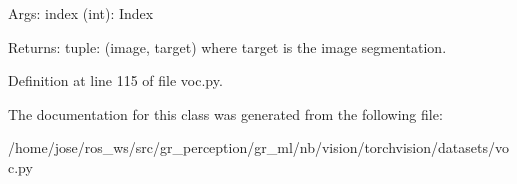 \begin{DoxyVerb}Args:
    index (int): Index

Returns:
    tuple: (image, target) where target is the image segmentation.
\end{DoxyVerb}
 

Definition at line 115 of file voc.\+py.



The documentation for this class was generated from the following file\+:\begin{DoxyCompactItemize}
\item 
/home/jose/ros\+\_\+ws/src/gr\+\_\+perception/gr\+\_\+ml/nb/vision/torchvision/datasets/voc.\+py\end{DoxyCompactItemize}
